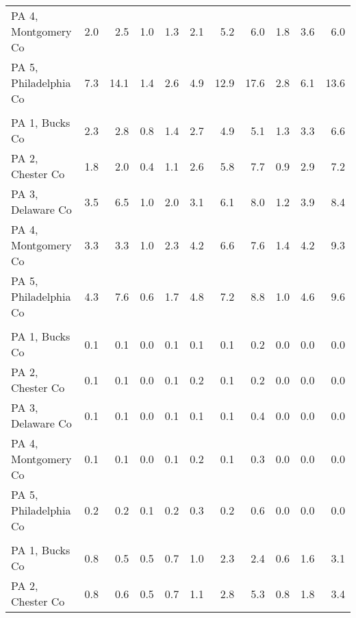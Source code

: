 \begin{longtable}[l]{l|rrrrrrrrrr}
\hspace{1em}PA 4, Montgomery Co & 2.0 & 2.5 & 1.0 & 1.3 & 2.1 & 5.2 & 6.0 & 1.8 & 3.6 & 6.0\\
\hspace{1em}PA 5, Philadelphia Co & 7.3 & 14.1 & 1.4 & 2.6 & 4.9 & 12.9 & 17.6 & 2.8 & 6.1 & 13.6\\
\addlinespace[0.5em]
\multicolumn{11}{l}{\textbf{\% API, non-Hispanic}}\\
\hspace{1em}PA 1, Bucks Co & 2.3 & 2.8 & 0.8 & 1.4 & 2.7 & 4.9 & 5.1 & 1.3 & 3.3 & 6.6\\
\hspace{1em}PA 2, Chester Co & 1.8 & 2.0 & 0.4 & 1.1 & 2.6 & 5.8 & 7.7 & 0.9 & 2.9 & 7.2\\
\hspace{1em}PA 3, Delaware Co & 3.5 & 6.5 & 1.0 & 2.0 & 3.1 & 6.1 & 8.0 & 1.2 & 3.9 & 8.4\\
\hspace{1em}PA 4, Montgomery Co & 3.3 & 3.3 & 1.0 & 2.3 & 4.2 & 6.6 & 7.6 & 1.4 & 4.2 & 9.3\\
\hspace{1em}PA 5, Philadelphia Co & 4.3 & 7.6 & 0.6 & 1.7 & 4.8 & 7.2 & 8.8 & 1.0 & 4.6 & 9.6\\
\addlinespace[0.5em]
\multicolumn{11}{l}{\textbf{\% Native, non-Hispanic}}\\
\hspace{1em}PA 1, Bucks Co & 0.1 & 0.1 & 0.0 & 0.1 & 0.1 & 0.1 & 0.2 & 0.0 & 0.0 & 0.0\\
\hspace{1em}PA 2, Chester Co & 0.1 & 0.1 & 0.0 & 0.1 & 0.2 & 0.1 & 0.2 & 0.0 & 0.0 & 0.0\\
\hspace{1em}PA 3, Delaware Co & 0.1 & 0.1 & 0.0 & 0.1 & 0.1 & 0.1 & 0.4 & 0.0 & 0.0 & 0.0\\
\hspace{1em}PA 4, Montgomery Co & 0.1 & 0.1 & 0.0 & 0.1 & 0.2 & 0.1 & 0.3 & 0.0 & 0.0 & 0.0\\
\hspace{1em}PA 5, Philadelphia Co & 0.2 & 0.2 & 0.1 & 0.2 & 0.3 & 0.2 & 0.6 & 0.0 & 0.0 & 0.0\\
\addlinespace[0.5em]
\multicolumn{11}{l}{\textbf{\% two+ races, non-Hispanic}}\\
\hspace{1em}PA 1, Bucks Co & 0.8 & 0.5 & 0.5 & 0.7 & 1.0 & 2.3 & 2.4 & 0.6 & 1.6 & 3.1\\
\hspace{1em}PA 2, Chester Co & 0.8 & 0.6 & 0.5 & 0.7 & 1.1 & 2.8 & 5.3 & 0.8 & 1.8 & 3.4\\

\end{longtable}
